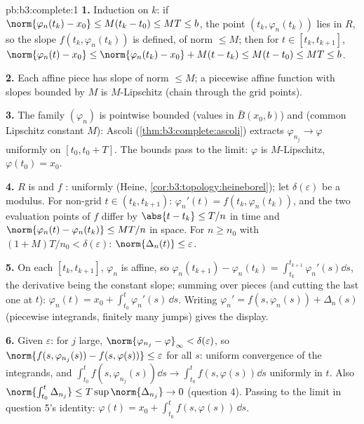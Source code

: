 \begin{solution}{pb:b3:complete:1}
\textbf{1.} Induction on $k$: if $\norm{\varphi_n(t_k) - x_0}
\leq M(t_k - t_0) \leq MT \leq b$, the point $(t_k,
\varphi_n(t_k))$ lies in $R$, so the slope $f(t_k,
\varphi_n(t_k))$ is defined, of norm $\leq M$; then for $t \in
[t_k, t_{k+1}]$, $\norm{\varphi_n(t) - x_0} \leq
\norm{\varphi_n(t_k) - x_0} + M(t - t_k) \leq M(t - t_0) \leq
MT \leq b$.

\textbf{2.} Each affine piece has slope of norm $\leq M$; a
piecewise affine function with slopes bounded by $M$ is
$M$-Lipschitz (chain through the grid points).

\textbf{3.} The family $(\varphi_n)$ is pointwise bounded
(values in $\bar B(x_0, b)$) and  (common
Lipschitz constant $M$): Ascoli
(\cref{thm:b3:complete:ascoli}) extracts $\varphi_{n_j} \to
\varphi$ uniformly on $[t_0, t_0 + T]$. The bounds pass to the
limit: $\varphi$ is $M$-Lipschitz, $\varphi(t_0) = x_0$.

\textbf{4.} $R$ is  and $f$ : uniformly
 (Heine, \cref{cor:b3:topology:heineborel}); let
$\delta(\varepsilon)$ be a modulus. For non-grid $t \in (t_k,
t_{k+1})$: $\varphi_n'(t) = f(t_k, \varphi_n(t_k))$, and the
two evaluation points of $f$ differ by $\abs{t - t_k} \leq T/n$
in time and $\norm{\varphi_n(t) - \varphi_n(t_k)} \leq MT/n$ in
space. For $n \geq n_0$ with $(1 + M)T/n_0 < \delta(\varepsilon)$:
$\norm{\Delta_n(t)} \leq \varepsilon$.

\textbf{5.} On each $[t_k, t_{k+1}]$, $\varphi_n$ is affine, so
$\varphi_n(t_{k+1}) - \varphi_n(t_k) = \int_{t_k}^{t_{k+1}}
\varphi_n'(s)\dd s$, the derivative being the constant slope;
summing over pieces (and cutting the last one at $t$):
$\varphi_n(t) = x_0 + \int_{t_0}^t\varphi_n'(s)\,\dd s$.
Writing $\varphi_n' = f(s, \varphi_n(s)) + \Delta_n(s)$
(piecewise  integrands, finitely many jumps) gives
the display.

\textbf{6.} Given $\varepsilon$: for $j$ large,
$\norm{\varphi_{n_j} - \varphi}_\infty < \delta(\varepsilon)$,
so $\norm{f(s, \varphi_{n_j}(s)) - f(s, \varphi(s))} \leq
\varepsilon$ for all $s$: uniform convergence of the
integrands, and $\int_{t_0}^t f(s,\varphi_{n_j}(s))\dd s \to
\int_{t_0}^tf(s, \varphi(s))\dd s$ uniformly in $t$. Also
$\norm{\int_{t_0}^t\Delta_{n_j}} \leq T\sup\norm{\Delta_{n_j}}
\to 0$ (question 4). Passing to the limit in question 5's
identity: $\varphi(t) = x_0 + \int_{t_0}^tf(s,
\varphi(s))\,\dd s$.


\end{solution}
